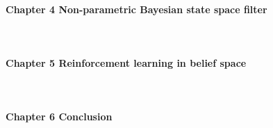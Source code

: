 \begin{minipage}[c]{0.9\textwidth}
\paragraph{Chapter 4 Non-parametric Bayesian state space filter}\\
\end{minipage}

\begin{minipage}[c]{0.9\textwidth}
\paragraph{Chapter 5 Reinforcement learning in belief space}\\
\end{minipage}

\begin{minipage}[c]{0.9\textwidth}
\paragraph{Chapter 6 Conclusion}\\
\end{minipage}







